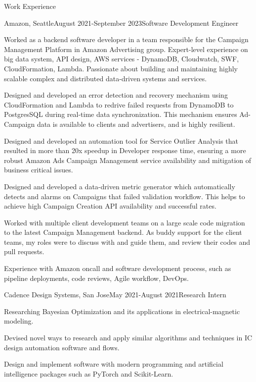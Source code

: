 \documentclass{resume} %
\begin{document}
\begin{rSection}{Work Experience}

\begin{rSubsection}{Amazon, Seattle}{August 2021-September 2023}{Software Development Engineer}{} 

    \item Worked as a backend software developer in a team responsible for the Campaign Management Platform in Amazon Advertising group. Expert-level experience on big data system, API design, AWS services - DynamoDB, Cloudwatch, SWF, CloudFormation, Lambda. Passionate about building and maintaining highly scalable complex and distributed data-driven systems and services.  
    
    \item Designed and developed an error detection and recovery mechanism using CloudFormation and Lambda to redrive failed requests from DynamoDB to PostgresSQL during real-time data synchronization. This mechanism ensures Ad-Campaign data is available to clients and advertisers, and is highly resilient.
    
    \item Designed and developed an automation tool for Service Outlier Analysis that resulted in more than 20x speedup in Developer response time, ensuring a more robust Amazon Ads Campaign Management service availability and mitigation of business critical issues.
    
    \item Designed and developed a data-driven metric generator which automatically detects and alarms on Campaigns that failed validation workflow. This helps to achieve high Campaign Creation API availability and successful rates.
    
    \item Worked with multiple client development teams on a large scale code migration to the latest Campaign Management backend. As buddy support for the client teams, my roles were to discuss with and guide them, and review their codes and pull requests.
    
    \item Experience with Amazon oncall and software development process, such as pipeline deployments, code reviews, Agile workflow, DevOps. 

\end{rSubsection}

\begin{rSubsection}{Cadence Design Systems, San Jose}{May 2021-August 2021}{Research Intern}{} 
    \item Researching Bayesian Optimization and its applications in electrical-magnetic modeling. 
    \item Devised novel ways to research and apply similar algorithms and techniques in IC design automation software and flows. 
    \item Design and implement software with modern programming and artificial intelligence packages such as PyTorch and Scikit-Learn.
\end{rSubsection}


\end{rSection}
\end{document}
